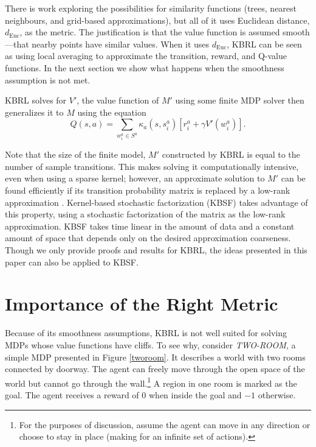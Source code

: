 \documentclass{article} %
\begin{document}
There is work \cite{kbrl2} exploring the possibilities for similarity
functions (trees, nearest neighbours, and grid-based approximations),
but all of it uses Euclidean distance, $d_{\mathrm{Euc}}$, as the metric.
The justification is that the value function is assumed smooth---that nearby
points have similar values.
When it uses $d_{\mathrm{Euc}}$, KBRL can be seen as using local averaging
to approximate the transition, reward, and Q-value functions.
In the next section we show what happens when the smoothness assumption is
not met.

KBRL solves for $V'$, the value function of $M'$ using some finite MDP solver
then generalizes it to $M$ using the equation
$$Q(s,a) = \sum_{w^a_i \in S^a}
\kappa_a(s,s_i^a)\left[r_i^a + \gamma V'(w^a_i)\right].$$

Note that the size of the finite model, $M'$ constructed by KBRL is equal to the
number of sample transitions.
This makes solving it computationally intensive, even when using a sparse
kernel; however,
an approximate solution to $M'$ can be found
efficiently if its transition probability matrix is replaced by a low-rank
approximation \cite{pkbrl}. Kernel-based stochastic factorization (KBSF)
takes advantage of this property, using a stochastic factorization of the
matrix as the low-rank approximation.
KBSF takes time linear in the amount of data and a constant amount
of space that depends only on the desired approximation coarseness.
Though we only provide proofs and results for KBRL, the ideas presented
in this paper can also be applied to KBSF.

\section{Importance of the Right Metric}
Because of its smoothness assumptions, KBRL is not well suited
for solving MDPs whose value functions have cliffs.
To see why, consider \textit{TWO-ROOM},
a simple MDP presented in Figure \ref{tworoom}.
It describes a world with two rooms connected by doorway.
The agent can freely move through the open space of the world but cannot
go through the wall.\footnote{For the purposes of discussion, assume the agent can move in any
direction or choose to stay in place (making for an infinite set of actions).}
 A region in one room is marked as the goal.
The agent receives a reward of $0$ when inside the goal and $-1$ otherwise.
\end{document}
